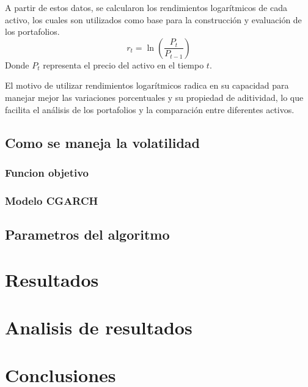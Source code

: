\documentclass[12pt]{article}
\begin{document}
A partir de estos datos, se calcularon los rendimientos logarítmicos
de cada activo, los cuales son utilizados como base para la
construcción y evaluación de los portafolios.
\begin{equation}
  r_t = \ln\left(\frac{P_t}{P_{t-1}}\right)
\end{equation}
Donde \( P_t \) representa el precio del activo en el tiempo \( t \).

El motivo de utilizar rendimientos logarítmicos radica en su
capacidad para manejar mejor las variaciones porcentuales y su
propiedad de aditividad, lo que facilita el análisis de los
portafolios y la comparación entre diferentes activos.
\subsection{Como se maneja la volatilidad}
\subsubsection{Funcion objetivo}
\subsubsection{Modelo CGARCH}
\subsection{Parametros del algoritmo}
\section{Resultados}
\section{Analisis de resultados}
\section{Conclusiones}
 
\end{document}
